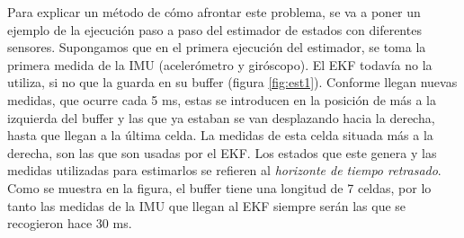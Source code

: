 Para explicar un método de cómo afrontar  este problema, se va a poner un ejemplo de la ejecución paso a paso del estimador de estados con diferentes sensores.
Supongamos que en el primera ejecución del estimador, se toma la primera medida de la IMU (acelerómetro y giróscopo). El EKF todavía no la utiliza, si no que la guarda en su buffer (figura \ref{fig:est1}). Conforme llegan nuevas medidas, que ocurre cada 5 ms, estas se introducen en la posición de más a la izquierda del buffer y las que ya estaban se van desplazando hacia la derecha, hasta que llegan a la última celda. La medidas de esta celda situada más a la derecha, son las que son usadas por el EKF. Los estados que este genera y las medidas utilizadas para estimarlos se refieren al \textit{horizonte de tiempo retrasado}. Como se muestra en la figura, el buffer tiene una longitud de 7 celdas, por lo tanto las medidas de la IMU que llegan al EKF siempre serán las que se recogieron hace 30 ms.  


